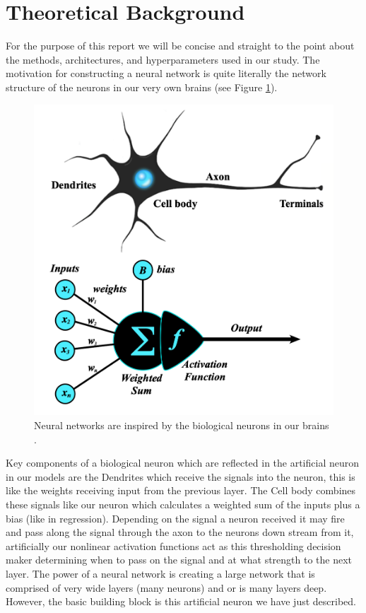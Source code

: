 \documentclass[10pt]{amsart}
\begin{document}
\section{Theoretical Background}\label{sec:theory}
For the purpose of this report we will be concise and straight to the point about the methods, architectures, and hyperparameters used in our study.
The motivation for constructing a neural network is quite literally the network structure of the neurons in our very own brains (see Figure \ref{fig:neuron}).

\begin{figure}[h]
	\centering
	\includegraphics[width=.2\textwidth]{../visualizations/perceptron-with-neuron.png}
 	\caption{Neural networks are inspired by the biological neurons in our brains \cite{mriquestionsDeepLearning}.}\label{fig:neuron}
\vspace*{-2mm}
\end{figure}

Key components of a biological neuron which are reflected in the artificial neuron in our models are the Dendrites which receive the signals into the neuron, this is like the weights receiving input from the previous layer.
The Cell body combines these signals like our neuron which calculates a weighted sum of the inputs plus a bias (like in regression).
Depending on the signal a neuron received it may fire and pass along the signal through the axon to the neurons down stream from it, artificially our nonlinear activation functions act as this thresholding decision maker determining when to pass on the signal and at what strength to the next layer.
The power of a neural network is creating a large network that is comprised of very wide layers (many neurons) and or is many layers deep.
However, the basic building block is this artificial neuron we have just described.
\end{document}
